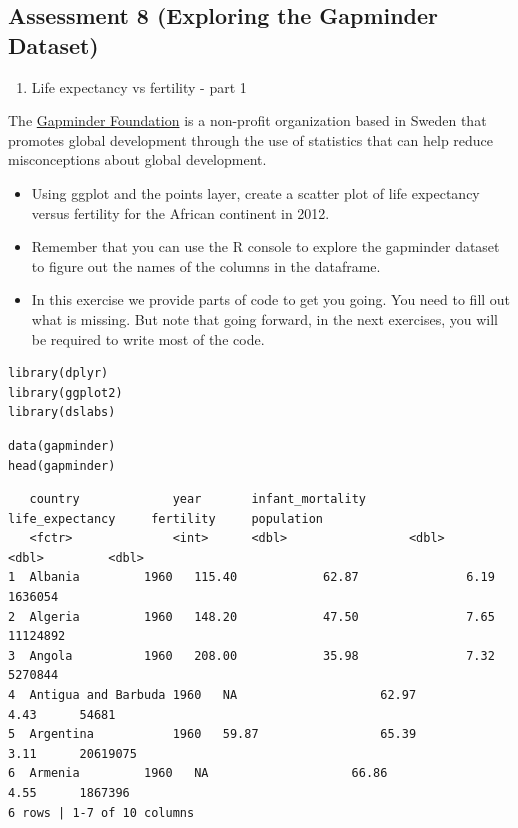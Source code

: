 \documentclass[
]{article}
\providecommand{\tightlist}{%
  \setlength{\itemsep}{0pt}\setlength{\parskip}{0pt}}
\begin{document}
\hypertarget{assessment-8-exploring-the-gapminder-dataset}{%
\subsection{Assessment 8 (Exploring the Gapminder
Dataset)}\label{assessment-8-exploring-the-gapminder-dataset}}

\begin{enumerate}
\def\labelenumi{\arabic{enumi}.}
\tightlist
\item
  Life expectancy vs fertility - part 1
\end{enumerate}

The \href{https://www.gapminder.org/}{Gapminder Foundation} is a
non-profit organization based in Sweden that promotes global development
through the use of statistics that can help reduce misconceptions about
global development.

\begin{itemize}
\tightlist
\item
  Using ggplot and the points layer, create a scatter plot of life
  expectancy versus fertility for the African continent in 2012.
\item
  Remember that you can use the R console to explore the gapminder
  dataset to figure out the names of the columns in the dataframe.
\item
  In this exercise we provide parts of code to get you going. You need
  to fill out what is missing. But note that going forward, in the next
  exercises, you will be required to write most of the code.
\end{itemize}

\begin{verbatim}
library(dplyr)
library(ggplot2)
library(dslabs)
\end{verbatim}

\begin{verbatim}
data(gapminder)
head(gapminder)
\end{verbatim}

\begin{verbatim}
   country             year       infant_mortality      life_expectancy     fertility     population
   <fctr>              <int>      <dbl>                 <dbl>               <dbl>         <dbl>
1  Albania         1960   115.40            62.87               6.19      1636054   
2  Algeria         1960   148.20            47.50               7.65      11124892  
3  Angola          1960   208.00            35.98               7.32      5270844   
4  Antigua and Barbuda 1960   NA                    62.97               4.43      54681 
5  Argentina           1960   59.87                 65.39               3.11      20619075  
6  Armenia         1960   NA                    66.86               4.55      1867396   
6 rows | 1-7 of 10 columns
\end{verbatim}
\end{document}
